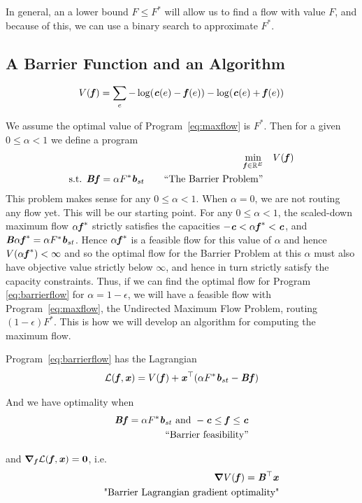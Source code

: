 In general, an a lower
bound $F \leq F^*$ will allow us to find a flow with value $F$, and
because of this, we can use a binary search to approximate $F^*$.

\subsection{A Barrier Function and an Algorithm}
\[
V(\boldsymbol{\mathit{f}}) = \sum_e -\log(\boldsymbol{\mathit{c}}(e)-\boldsymbol{\mathit{f}}(e))  -\log(\boldsymbol{\mathit{c}}(e)+\boldsymbol{\mathit{f}}(e)) 
\]

We assume the optimal value of Program~\eqref{eq:maxflow} is $F^*$.
Then for a given $0 \leq \alpha < 1$ we define a program
\begin{align}
   \label{eq:barrierflow}
\min_{\boldsymbol{\mathit{f}} \in \mathbb{R}^E} & \quad  V(\boldsymbol{\mathit{f}})\\
\textrm{s.t. }  \boldsymbol{\mathit{B}}\boldsymbol{\mathit{f}}= \alpha F^* \boldsymbol{\mathit{b}}_{st}
  \tag*{``The Barrier Problem''}
\end{align}
This problem makes sense for any $0 \leq \alpha < 1$.
When $\alpha = 0$, we are not routing any flow yet. This will be our
starting point.
For any $0 \leq \alpha < 1$, the scaled-down maximum
flow $\alpha\boldsymbol{\mathit{f}}^*$ strictly satisfies the capacities $ -\boldsymbol{\mathit{c}} < \alpha\boldsymbol{\mathit{f}}^* < \boldsymbol{\mathit{c}}$, and
$\boldsymbol{\mathit{B}}\alpha\boldsymbol{\mathit{f}}^*= \alpha F^* \boldsymbol{\mathit{b}}_{st}$.
Hence $\alpha\boldsymbol{\mathit{f}}^*$ is a feasible flow for this value of $\alpha$ and 
hence $V(\alpha\boldsymbol{\mathit{f}}^*) < \infty$ and so the optimal flow for the
Barrier Problem at this $\alpha$ must also have objective value
strictly below $\infty$, and hence in
turn strictly satisfy the capacity constraints.
Thus, if we can find the optimal flow for Program
\eqref{eq:barrierflow} for $\alpha = 1-\epsilon$, we will have a
feasible flow with Program~\eqref{eq:maxflow}, the Undirected Maximum Flow Problem, routing
$(1-\epsilon)F^*$.
This is how we will develop an algorithm for computing the maximum flow.

Program~\eqref{eq:barrierflow}  has the Lagrangian
\[
\mathcal{L}(\boldsymbol{\mathit{f}},\boldsymbol{\mathit{x}}) = V(\boldsymbol{\mathit{f}}) + \boldsymbol{\mathit{x}}^{\top}( \alpha F^* \boldsymbol{\mathit{b}}_{st}  - \boldsymbol{\mathit{B}}\boldsymbol{\mathit{f}}   )
\]

And we have optimality when
\begin{align}
  \label{eq:barrierfeasibility}
  \boldsymbol{\mathit{B}}\boldsymbol{\mathit{f}}= \alpha  F^* \boldsymbol{\mathit{b}}_{st}
  \text{ and }
  -\boldsymbol{\mathit{c}} \leq \boldsymbol{\mathit{f}} \leq \boldsymbol{\mathit{c}}
  \\
  \tag*{``Barrier feasibility''}
\end{align}

and $\boldsymbol{\nabla}_{\boldsymbol{\mathit{f}}} \mathcal{L}(\boldsymbol{\mathit{f}},\boldsymbol{\mathit{x}}) = \boldsymbol{0}$, i.e.
\begin{align}
  \label{eq:barrierlagrangegrad}
  \boldsymbol{\nabla} V(\boldsymbol{\mathit{f}}) = \boldsymbol{\mathit{B}}^{\top} \boldsymbol{\mathit{x}}
  \\
  \tag*{"Barrier Lagrangian gradient optimality"}
\end{align}

